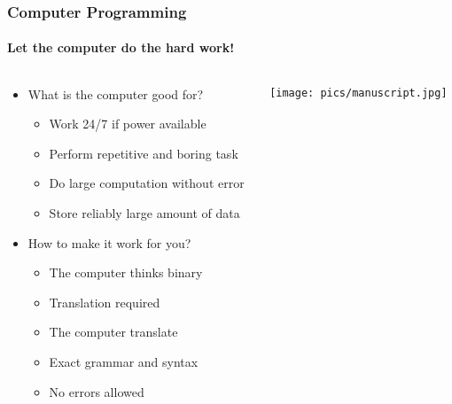 \documentclass[unknownkeysallowed, 10pt, a4 paper, handout]{beamer}
\begin{document}
\begin{frame}[label=textedit]
  \frametitle{Computer Programming}
  \framesubtitle{Let the computer do the hard work!}
  \begin{columns}[T]
    \begin{column}{.55\textwidth}
      \begin{itemize}
        \item What is the computer good for?
        \begin{itemize}
          \item Work 24/7 if power available
          \item Perform repetitive and boring task
          \item Do large computation without error
          \item Store reliably large amount of data
        \end{itemize}
        \item How to make it work for you?
        \begin{itemize}
          \item The computer thinks binary
          \item Translation required
          \item The computer translate
          \item Exact grammar and syntax
          \item No errors allowed
        \end{itemize}
      \end{itemize}
    \end{column}
    \hfill
    \begin{column}{.45\textwidth}
      \vspace{10pt}
       \texttt{[image: pics/manuscript.jpg]}
    \end{column}
  \end{columns}
\end{frame}
\end{document}
